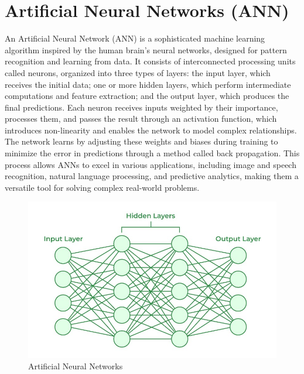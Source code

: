 \documentclass[12pt,a4paper]{report}
\begin{document}
\chapter{Artificial Neural Networks (ANN)}
An Artificial Neural Network (ANN) is a sophisticated machine learning algorithm inspired by the human brain's neural networks, designed for pattern recognition and learning from data. It consists of interconnected processing units called neurons, organized into three types of layers: the input layer, which receives the initial data; one or more hidden layers, which perform intermediate computations and feature extraction; and the output layer, which produces the final predictions. Each neuron receives inputs weighted by their importance, processes them, and passes the result through an activation function, which introduces non-linearity and enables the network to model complex relationships. The network learns by adjusting these weights and biases during training to minimize the error in predictions through a method called back propagation. This process allows ANNs to excel in various applications, including image and speech recognition, natural language processing, and predictive analytics, making them a versatile tool for solving complex real-world problems. \cite{geeksforgeeks_ann}

\begin{figure}[htbp]
    \centering
    \includegraphics[width=\textwidth]{ANN_ALOGORITHM.jpg}
    \caption{Artificial Neural Networks}
    \label{fig:ANN}
\end{figure}
\end{document}
